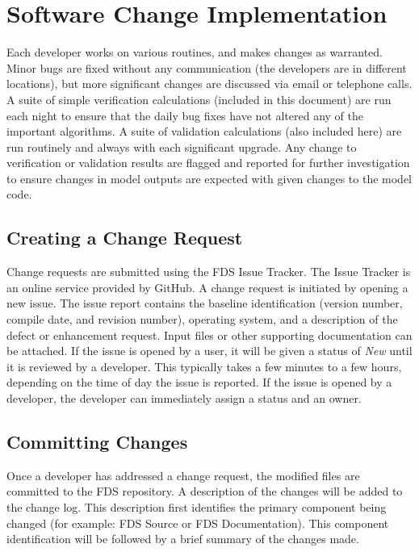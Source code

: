 \documentclass[11pt]{book}
\begin{document}
\section{Software Change Implementation}

Each developer works on various routines, and makes changes as warranted. Minor bugs are fixed without any communication (the developers are in different locations), but more significant changes are discussed via email or telephone calls. A suite of simple verification calculations (included in this document) are run each night to ensure that the daily bug fixes have not altered any of the important algorithms. A suite of validation calculations (also included here) are run routinely and always with each significant upgrade. Any change to verification or validation results are flagged and reported for further investigation to ensure changes in model outputs are expected with given changes to the model code.


\subsection{Creating a Change Request}

Change requests are submitted using the FDS Issue Tracker.  The Issue Tracker is an online service provided by GitHub. A change request is initiated by opening a new issue.  The issue report contains the baseline identification (version number, compile date, and revision number), operating system, and a description of the defect or enhancement request.  Input files or other supporting documentation can be attached. If the issue is opened by a user, it will be given a status of {\em New} until it is reviewed by a developer. This typically takes a few minutes to a few hours, depending on the time of day the issue is reported. If the issue is opened by a developer, the developer can immediately assign a status and an owner.


\subsection{Committing Changes}

Once a developer has addressed a change request, the modified files are committed to the FDS repository.  A description of the changes will be added to the change log.  This description first identifies the primary component being changed (for example: FDS Source or FDS Documentation).  This component identification will be followed by a brief summary of the changes made.
\end{document}
